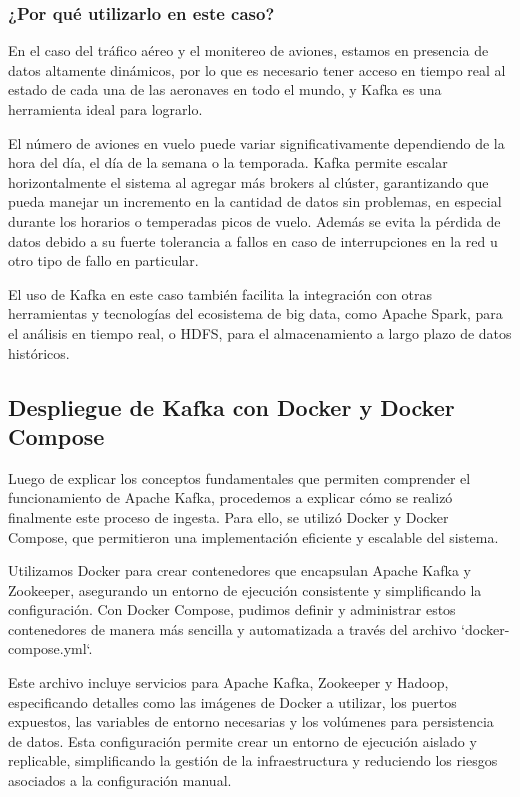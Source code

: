 \documentclass{article}
\begin{document}
\subsubsection{¿Por qué utilizarlo en este caso?}

En el caso del tráfico aéreo y el monitereo de aviones, estamos en presencia de datos altamente dinámicos, por lo que es necesario tener acceso en tiempo real al estado de cada una de las aeronaves en todo el mundo, y Kafka es una herramienta ideal para lograrlo.

El número de aviones en vuelo puede variar significativamente dependiendo de la hora del día, el día de la semana o la temporada. Kafka permite escalar horizontalmente el sistema al agregar más brokers al clúster, garantizando que pueda manejar un incremento en la cantidad de datos sin problemas, en especial durante los horarios o temperadas picos de vuelo. Además se evita la pérdida de datos debido a su fuerte tolerancia a fallos en caso de interrupciones en la red u otro tipo de fallo en particular.

El uso de Kafka en este caso también facilita la integración con otras herramientas y tecnologías del ecosistema de big data, como Apache Spark, para el análisis en tiempo real, o HDFS, para el almacenamiento a largo plazo de datos históricos.

\subsection{Despliegue de Kafka con Docker y Docker Compose}

Luego de explicar los conceptos fundamentales que permiten comprender el funcionamiento de Apache Kafka, procedemos a explicar cómo se realizó finalmente este proceso de ingesta. Para ello, se utilizó Docker y Docker Compose, que permitieron una implementación eficiente y escalable del sistema.

Utilizamos Docker para crear contenedores que encapsulan Apache Kafka y Zookeeper, asegurando un entorno de ejecución consistente y simplificando la configuración. Con Docker Compose, pudimos definir y administrar estos contenedores de manera más sencilla y automatizada a través del archivo `docker-compose.yml`.

Este archivo incluye servicios para Apache Kafka, Zookeeper y Hadoop, especificando detalles como las imágenes de Docker a utilizar, los puertos expuestos, las variables de entorno necesarias y los volúmenes para persistencia de datos. Esta configuración permite crear un entorno de ejecución aislado y replicable, simplificando la gestión de la infraestructura y reduciendo los riesgos asociados a la configuración manual.
\end{document}
